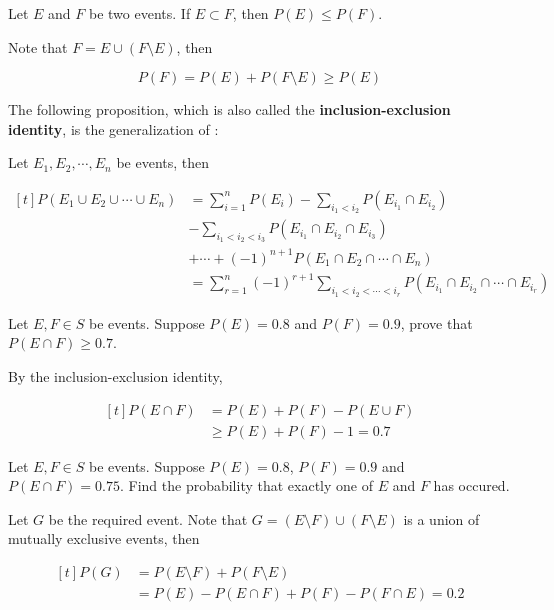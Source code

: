 \documentclass[a4paper,12pt]{article}
\begin{document}
\begin{pst}
  Let $E$ and $F$ be two events. If $E\subset F$, then $P(E)\leq P(F)$.\n

  \prf Note that $F=E\cup(F\setminus E)$, then

  $$P(F)=P(E)+P(F\setminus E)\geq P(E)$$
\end{pst}\n

The following proposition, which is also called the \textbf{inclusion-exclusion identity}, is the generalization of \rpst[\sctr{1}]:\n

\begin{pst}
  Let $E_{1},E_{2},\cdots,E_{n}$ be events, then

  $$\begin{aligned}[t]
    P(E_{1}\cup E_{2}\cup\cdots\cup E_{n})&=\sum_{i=1}^{n}P(E_{i})-\sum_{i_{1}<i_{2}}P(E_{i_{1}}\cap E_{i_{2}})\\
    &-\sum_{i_{1}<i_{2}<i_{3}}P(E_{i_{1}}\cap E_{i_{2}}\cap E_{i_{3}})\\
    &+\cdots+(-1)^{n+1}P(E_{1}\cap E_{2}\cap\cdots\cap E_{n})\\
    &=\sum_{r=1}^{n}(-1)^{r+1}\sum_{i_{1}<i_{2}<\cdots<i_{r}}P(E_{i_{1}}\cap E_{i_{2}}\cap\cdots\cap E_{i_{r}})
  \end{aligned}$$
\end{pst}\n

\begin{exm}
  Let $E,F\in S$ be events. Suppose $P(E)=0.8$ and $P(F)=0.9$, prove that $P(E\cap F)\geq 0.7$.\n

  \ans By the inclusion-exclusion identity,

  $$\begin{aligned}[t]
    P(E\cap F)&=P(E)+P(F)-P(E\cup F)\\
    &\geq P(E)+P(F)-1=0.7
  \end{aligned}$$
\end{exm}\n

\begin{exm}
  Let $E,F\in S$ be events. Suppose $P(E)=0.8$, $P(F)=0.9$ and $P(E\cap F)=0.75$. Find the probability that exactly one of $E$ and $F$ has occured.\n

  \ans Let $G$ be the required event. Note that $G=(E\setminus F)\cup(F\setminus E)$ is a union of mutually exclusive events, then

  $$\begin{aligned}[t]
    P(G)&=P(E\setminus F)+P(F\setminus E)\\
    &=P(E)-P(E\cap F)+P(F)-P(F\cap E)=0.2   
  \end{aligned}$$
\end{exm}
\end{document}
